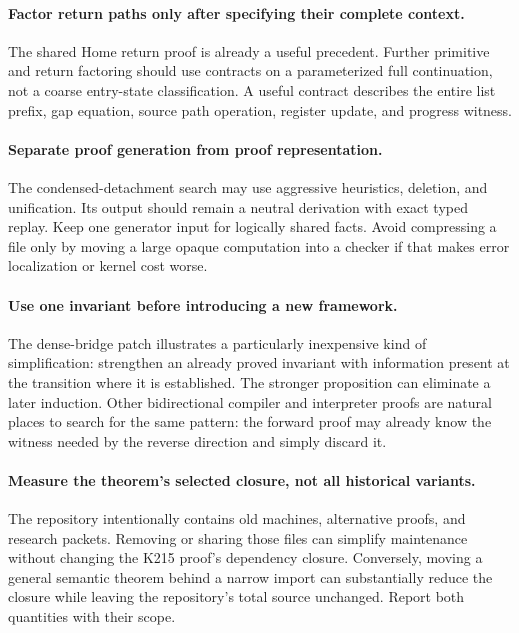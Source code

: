 \documentclass[11pt,letterpaper]{article}
\begin{document}
\paragraph{Factor return paths only after specifying their complete context.}
The shared Home return proof is already a useful precedent. Further primitive and
return factoring should use contracts on a parameterized full continuation, not a
coarse entry-state classification. A useful contract describes the entire list prefix,
gap equation, source path operation, register update, and progress witness.

\paragraph{Separate proof generation from proof representation.}
The condensed-detachment search may use aggressive heuristics, deletion, and
unification. Its output should remain a neutral derivation with exact typed replay.
Keep one generator input for logically shared facts. Avoid compressing a file only
by moving a large opaque computation into a checker if that makes error localization
or kernel cost worse.

\paragraph{Use one invariant before introducing a new framework.}
The dense-bridge patch illustrates a particularly inexpensive kind of simplification:
strengthen an already proved invariant with information present at the transition
where it is established. The stronger proposition can eliminate a later induction.
Other bidirectional compiler and interpreter proofs are natural places to search for
the same pattern: the forward proof may already know the witness needed by the reverse
direction and simply discard it.

\paragraph{Measure the theorem's selected closure, not all historical variants.}
The repository intentionally contains old machines, alternative proofs, and research
packets. Removing or sharing those files can simplify maintenance without changing the
K215 proof's dependency closure. Conversely, moving a general semantic theorem behind
a narrow import can substantially reduce the closure while leaving the repository's
total source unchanged. Report both quantities with their scope.
\end{document}
